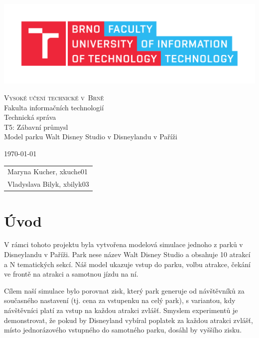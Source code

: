 \documentclass[a4paper,12pt]{article}
\begin{document}
\begin{center}
\includegraphics[width=1.0\textwidth]{fit.pdf} %

    \vspace{0.5cm} 
\Huge
\textsc{Vysoké učení technické v~Brně\\
}Fakulta informačních technologií\\
\Huge Technická správa \\
\LARGE T5: Zábavní průmysl \\
\LARGE  Model parku Walt Disney Studio v Disneylandu v Paříži\\

\Large 


\end{center}
{\Large \today \hfill
\begin{tabular}{l}
    Maryna Kucher, xkuche01 \\
    Vladyslava Bilyk, xbilyk03
\end{tabular}}
\thispagestyle{empty}

\newpage
\tableofcontents
\newpage

\section{Úvod}
V rámci tohoto projektu byla vytvořena modelová simulace jednoho z parků v Disneylandu v Paříži. Park nese název Walt Disney Studio a obsahuje 10 atrakcí a N tematických sekcí. Náš model ukazuje vstup do parku, volbu atrakce, čekání ve frontě na atrakci a samotnou jízdu na ní.

Cílem naší simulace bylo porovnat zisk, který park generuje od návštěvníků za současného nastavení (tj. cena za vstupenku na celý park), s variantou, kdy návštěvníci platí za vstup na každou atrakci zvlášť. Smyslem experimentů je demonstrovat, že pokud by Disneyland vybíral poplatek za každou atrakci zvlášť, místo jednorázového vstupného do samotného parku, dosáhl by vyššího zisku.
\end{document}
